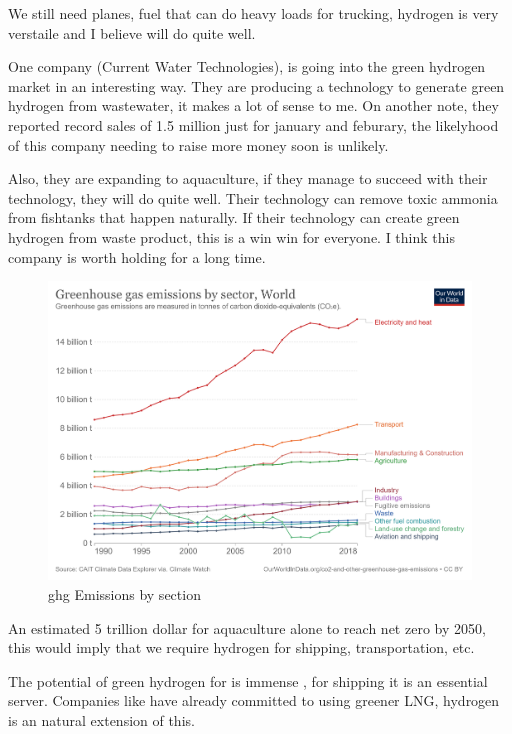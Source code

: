 We still need planes, fuel that can do heavy loads for trucking, hydrogen is very verstaile and I believe will do quite well.

One company  (Current Water Technologies), is going into the green hydrogen market in an interesting way. They are producing a technology to generate green hydrogen from wastewater, it makes a lot of sense to me. On another note, they reported record sales of 1.5 million just for january and feburary, the likelyhood of this company needing to raise more money soon is unlikely.

Also, they are expanding to aquaculture, if they manage to succeed with their technology, they will do quite well. Their technology can remove toxic ammonia from fishtanks that happen naturally. If their technology can create green hydrogen from waste product, this is a win win for everyone. I think this company is worth holding for a long time.


\begin{figure}[h]
\includegraphics[width=\textwidth]{src/media/ghg-emissions-by-sector.png}
\caption{ghg Emissions by section}
\end{figure}

An estimated 5 trillion dollar for aquaculture alone \cite{goldman_sachs_hydrogen_2022} to reach net zero by 2050, this would imply that we require hydrogen for shipping, transportation, etc.


The potential of green hydrogen for is immense \cite{shipping_green_hydrogen}, for shipping it is an essential server. Companies like  have already committed to using greener LNG, hydrogen is an natural extension of this.


